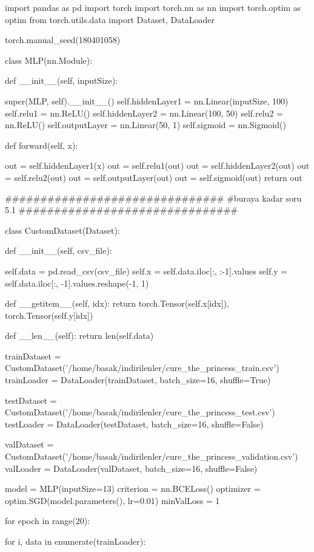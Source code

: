 \documentclass[11pt]{article}
\begin{document}
\begin{python}
import pandas as pd
import torch
import torch.nn as nn
import torch.optim as optim
from torch.utils.data import Dataset, DataLoader

torch.manual_seed(180401058)

class MLP(nn.Module):

    def __init__(self, inputSize):

        super(MLP, self).__init__()
        self.hiddenLayer1 = nn.Linear(inputSize, 100)
        self.relu1 = nn.ReLU()
        self.hiddenLayer2 = nn.Linear(100, 50)
        self.relu2 = nn.ReLU()
        self.outputLayer = nn.Linear(50, 1)
        self.sigmoid = nn.Sigmoid()

    def forward(self, x):

        out = self.hiddenLayer1(x)
        out = self.relu1(out)
        out = self.hiddenLayer2(out)
        out = self.relu2(out)
        out = self.outputLayer(out)
        out = self.sigmoid(out)
        return out

###############################
#buraya kadar soru 5.1
###############################

class CustomDataset(Dataset):

    def __init__(self, csv_file):

        self.data = pd.read_csv(csv_file)
        self.x = self.data.iloc[:, :-1].values
        self.y = self.data.iloc[:, -1].values.reshape(-1, 1)

    def __getitem__(self, idx):
        return torch.Tensor(self.x[idx]), torch.Tensor(self.y[idx])

    def __len__(self):
        return len(self.data)

trainDataset = CustomDataset('/home/basak/indirilenler/cure_the_princess_train.csv')
trainLoader = DataLoader(trainDataset, batch_size=16, shuffle=True)

testDataset = CustomDataset('/home/basak/indirilenler/cure_the_princess_test.csv')
testLoader = DataLoader(testDataset, batch_size=16, shuffle=False)

valDataset = CustomDataset('/home/basak/indirilenler/cure_the_princess_validation.csv')
valLoader = DataLoader(valDataset, batch_size=16, shuffle=False)

model = MLP(inputSize=13)
criterion = nn.BCELoss()
optimizer = optim.SGD(model.parameters(), lr=0.01)
minValLoss = 1

for epoch in range(20):

    for i, data in enumerate(trainLoader):


\end{python}
\end{document}

